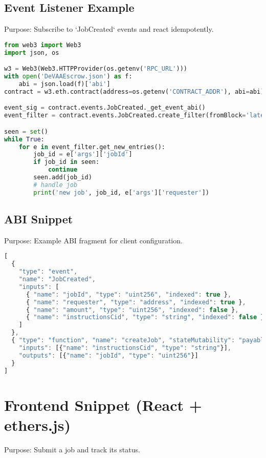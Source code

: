 \subsection{Event Listener Example}
\noindent Purpose: Subscribe to `JobCreated` events and react idempotently.

\begin{lstlisting}[language=Python,caption={listener.py}]
from web3 import Web3
import json, os

w3 = Web3(Web3.HTTPProvider(os.getenv('RPC_URL')))
with open('DeVAAEscrow.json') as f:
    abi = json.load(f)['abi']
contract = w3.eth.contract(address=os.getenv('CONTRACT_ADDR'), abi=abi)

event_sig = contract.events.JobCreated._get_event_abi()
event_filter = contract.events.JobCreated.create_filter(fromBlock='latest')

seen = set()
while True:
    for e in event_filter.get_new_entries():
        job_id = e['args']['jobId']
        if job_id in seen:
            continue
        seen.add(job_id)
        # handle job
        print('new job', job_id, e['args']['requester'])
\end{lstlisting}

\subsection{ABI Snippet}
\noindent Purpose: Example ABI fragment for client configuration.

\begin{lstlisting}[language=JavaScript,caption={DeVAAEscrow.abi.json}]
[
  {
    "type": "event",
    "name": "JobCreated",
    "inputs": [
      { "name": "jobId", "type": "uint256", "indexed": true },
      { "name": "requester", "type": "address", "indexed": true },
      { "name": "amount", "type": "uint256", "indexed": false },
      { "name": "instructionsCid", "type": "string", "indexed": false }
    ]
  },
  { "type": "function", "name": "createJob", "stateMutability": "payable",
    "inputs": [{"name": "instructionsCid", "type": "string"}],
    "outputs": [{"name": "jobId", "type": "uint256"}]
  }
]
\end{lstlisting}

\section{Frontend Snippet (React + ethers.js)}
\noindent Purpose: Submit a job and track its status.

